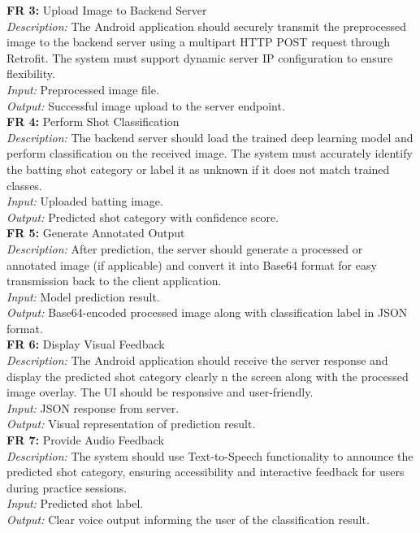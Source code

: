 \noindent\textbf{FR 3:} Upload Image to Backend Server\\
\textit{Description:} The Android application should securely transmit the preprocessed image to the backend server using a multipart HTTP POST request through Retrofit. The system must support dynamic server IP configuration to ensure flexibility.\\
\textit{Input:} Preprocessed image file.\\
\textit{Output:} Successful image upload to the server endpoint.\\

\noindent\textbf{FR 4:} Perform Shot Classification\\
\textit{Description:} The backend server should load the trained deep learning model and perform classification on the received image. The system must accurately identify the batting shot category or label it as unknown if it does not match trained classes.\\
\textit{Input:} Uploaded batting image.\\
\textit{Output:} Predicted shot category with confidence score.\\

\noindent\textbf{FR 5:} Generate Annotated Output\\
\textit{Description:} After prediction, the server should generate a processed or annotated image (if applicable) and convert it into Base64 format for easy transmission back to the client application.\\
\textit{Input:} Model prediction result.\\
\textit{Output:} Base64-encoded processed image along with classification label in JSON format.\\

\noindent\textbf{FR 6:} Display Visual Feedback\\
\textit{Description:} The Android application should receive the server response and display the predicted shot category clearly n the screen along with the processed image overlay. The UI should be responsive and user-friendly.\\
\textit{Input:} JSON response from server.\\
\textit{Output:} Visual representation of prediction result.\\

\noindent\textbf{FR 7:} Provide Audio Feedback\\
\textit{Description:} The system should use Text-to-Speech functionality to announce the predicted shot category, ensuring accessibility and interactive feedback for users during practice sessions.\\
\textit{Input:} Predicted shot label.\\
\textit{Output:} Clear voice output informing the user of the classification result.\\


